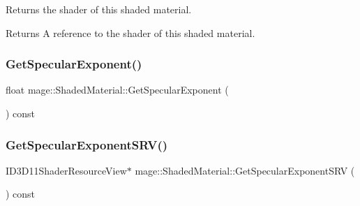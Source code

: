 Returns the shader of this shaded material.

\begin{DoxyReturn}{Returns}
A reference to the shader of this shaded material. 
\end{DoxyReturn}
\hypertarget{structmage_1_1_shaded_material_adb859615bf3461e9554e91550860d588}{}\label{structmage_1_1_shaded_material_adb859615bf3461e9554e91550860d588} 
\subsubsection{\texorpdfstring{Get\+Specular\+Exponent()}{GetSpecularExponent()}}
{\footnotesize\ttfamily float mage\+::\+Shaded\+Material\+::\+Get\+Specular\+Exponent (\begin{DoxyParamCaption}{ }\end{DoxyParamCaption}) const\hspace{0.3cm}{\ttfamily [noexcept]}}

\hypertarget{structmage_1_1_shaded_material_abae39d873aab545a59d1b611cf9b2025}{}\label{structmage_1_1_shaded_material_abae39d873aab545a59d1b611cf9b2025} 
\subsubsection{\texorpdfstring{Get\+Specular\+Exponent\+S\+R\+V()}{GetSpecularExponentSRV()}}
{\footnotesize\ttfamily I\+D3\+D11\+Shader\+Resource\+View$\ast$ mage\+::\+Shaded\+Material\+::\+Get\+Specular\+Exponent\+S\+RV (\begin{DoxyParamCaption}{ }\end{DoxyParamCaption}) const\hspace{0.3cm}{\ttfamily [noexcept]}}

\hypertarget{structmage_1_1_shaded_material_a25cfefef7f34cf03568c41b690264569}{}\label{structmage_1_1_shaded_material_a25cfefef7f34cf03568c41b690264569} 
